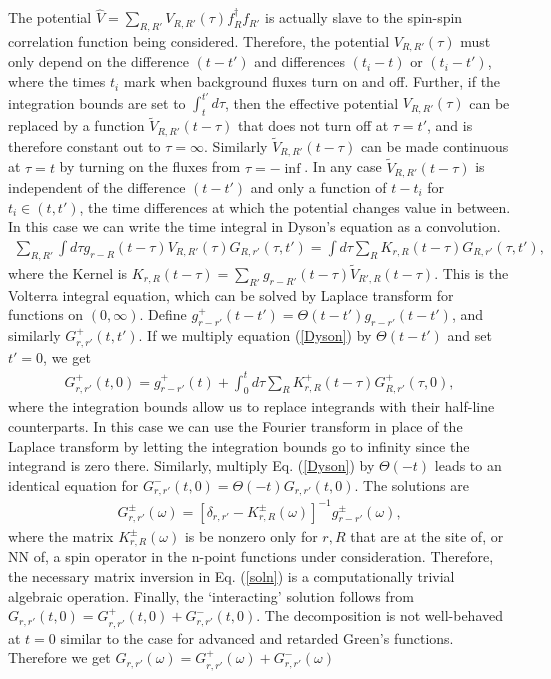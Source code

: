 \documentclass[aps,pra,preprint,groupedaddress]{revtex4-1}
\newcommand{\1}{\mathds{1}}
\begin{document}
The potential $\hat{V} = \sum_{R,R'} V_{R,R'}(\tau) f_R^\dagger f_{R'}$ is actually slave to the spin-spin correlation function being considered. Therefore, the potential $ V_{R,R'}(\tau) $ must only depend on the difference $(t-t')$ and differences $(t_i - t)$ or $(t_i-t')$, where the times $t_i$ mark when background fluxes turn on and off. Further, if the integration bounds are set to $\int_t^{t'} d\tau$, then the effective potential $V_{R,R'}(\tau)$ can be replaced by a function $\tilde{V}_{R,R'}(t-\tau)$ that does not turn off at $\tau = t'$, and is therefore constant out to $\tau = \infty$. Similarly $\tilde{V}_{R,R'}(t-\tau)$ can be made continuous at $\tau =t$ by turning on the fluxes from $\tau = -\inf$. In any case $\tilde{V}_{R,R'}(t-\tau)$ is independent of the difference $(t-t')$ and only a function of $t-t_i$ for $t_i \in (t,t')$, the time differences at which the potential changes value in between. In this case %
we can write the time integral in Dyson's equation as a convolution.
\begin{align}
\sum_{R,R'} \int d\tau  g_{r-R}(t-\tau) V_{R,R'}(\tau) G_{R,r'}(\tau,t') = \int d\tau \sum_R K_{r,R}(t-\tau) G_{R,r'}(\tau,t'),
\end{align}
where the Kernel is $K_{r,R}(t-\tau) = \sum_{R'} g_{r-R'}(t-\tau) \tilde{V}_{R',R}(t-\tau) $. This is the Volterra integral equation, which can be solved by Laplace transform \cite{Stone} for functions on $(0,\infty)$. Define $g_{r-r'}^+(t-t') = \Theta(t-t')g_{r-r'}(t-t')$, and similarly $G^+_{r,r'}(t,t')$. If we multiply equation (\ref{Dyson}) by $\Theta(t-t')$ and set $t'=0$, we get
\begin{align}
G^+_{r,r'}(t,0) = g^+_{r-r'}(t) + \int_0^{t} d\tau \sum_{R} K^+_{r,R}(t-\tau) G^+_{R,r'}(\tau,0),
\end{align}
where the integration bounds allow us to replace integrands with their half-line counterparts. %
In this case we can use the Fourier transform in place of the Laplace transform by letting the integration bounds go to infinity since the integrand is zero there. Similarly, multiply Eq. (\ref{Dyson}) by $\Theta(-t)$ leads to an identical equation for $G^-_{r,r'}(t,0) = \Theta(-t) G_{r,r'}(t,0)$. The solutions are
\begin{align}\label{soln}
G^{\pm}_{r,r'}(\omega) = \left[\delta_{r,r'} - K^\pm_{r,R}(\omega) \right]^{-1} g^\pm_{r-r'}(\omega),
\end{align}
where the matrix $K^\pm_{r,R}(\omega)$ is be nonzero only for $r,R$ that are at the site of, or NN of, a spin operator in the n-point functions under consideration. Therefore, the necessary matrix inversion in Eq. (\ref{soln}) is a computationally trivial algebraic operation. Finally, the `interacting' solution follows from $G_{r,r'}(t,0) = G^+_{r,r'}(t,0) + G^-_{r,r'}(t,0)$. The decomposition is not well-behaved at $t=0$ similar to the case for advanced and retarded Green's functions. Therefore we get $G_{r,r'}(\omega) = G^+_{r,r'}(\omega) + G^-_{r,r'}(\omega)$
\end{document}
